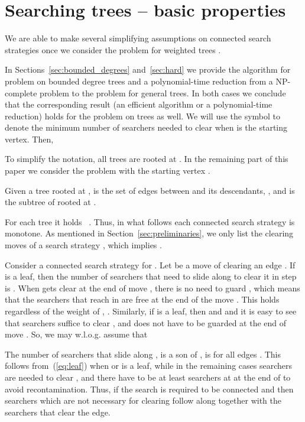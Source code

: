 \documentclass[10pt]{article}
\begin{document}
\section{Searching trees -- basic properties}
\label{sec:searching_trees}

We are able to make several simplifying assumptions on connected search strategies once we consider the  problem for weighted trees .

In Sections~\ref{sec:bounded_degrees} and~\ref{sec:hard} we provide the algorithm for  problem on bounded degree trees and a polynomial-time reduction from a NP-complete problem to the  problem for general trees. In both cases we conclude that the corresponding result (an efficient algorithm or a polynomial-time reduction) holds for the  problem on trees as well. We will use the symbol  to denote the minimum number of searchers needed to clear  when  is the starting vertex. Then,

To simplify the notation, all trees  are rooted at . In the remaining part of this paper we consider the  problem with the starting vertex .

Given a tree  rooted at ,  is the set of edges between  and its descendants, , and  is the subtree of  rooted at .

For each tree  it holds ~\cite{connected_weighted_trees}. Thus, in what follows each connected search strategy is monotone. As mentioned in Section~\ref{sec:preliminaries}, we only list the clearing moves of a search strategy , which implies .

Consider a connected search strategy  for . Let  be a move of clearing an edge . If  is a leaf, then the number of searchers that need to slide along  to clear it in step  is . When  gets clear at the end of move , there is no need to guard , which means that the searchers that reach  in  are free at the end of the move . This holds regardless of the weight of , . Similarly, if  is a leaf, then  and  and it is easy to see that  searchers suffice to clear , and  does not have to be guarded at the end of move . So, we may w.l.o.g. assume that

The number of searchers that slide along ,  is a son of , is  for all edges . This follows from~(\ref{eq:leaf}) when  or  is a leaf, while in the remaining cases  searchers are needed to clear , and there have to be at least  searchers at  at the end of  to avoid recontamination. Thus, if the search is required to be connected and  then  searchers which are not necessary for clearing  follow along  together with the  searchers that clear the edge.
\end{document}
